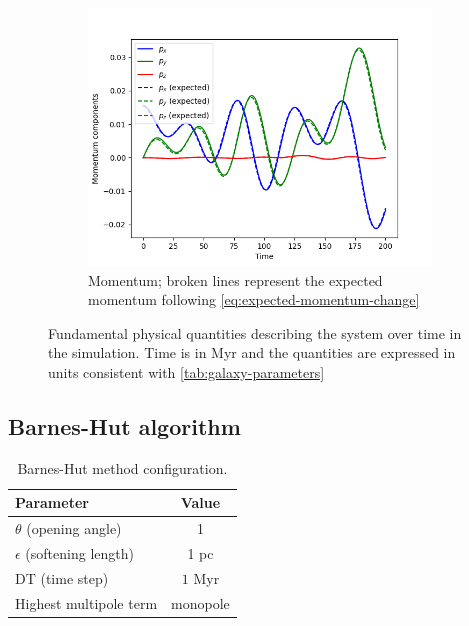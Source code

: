 \begin{figure}[H]
    \vspace{0.2cm}

    \begin{subfigure}[b]{0.5\textwidth}
        \centering
        \includegraphics[width=\textwidth]{chapters/results/img/p3m-galaxy/momentum.png}
        \caption{Momentum; broken lines represent the expected momentum following \autoref{eq:expected-momentum-change}}
        \label{fig:physical-quantities-p3m-sub3}
    \end{subfigure}

    \caption{Fundamental physical quantities describing the system over time in the \PThreeM{} simulation.
        Time is in Myr and the quantities are expressed in units consistent with \autoref{tab:galaxy-parameters}}
    \label{fig:physical-quantities-p3m}
\end{figure}

\subsection{Barnes-Hut algorithm}
\begin{table}[H]
    \centering
    \caption{Barnes-Hut method configuration.}
    \label{tab:bh-method-parameters}
    \begin{tabular}{lc}
        \toprule
        \textbf{Parameter}            & \textbf{Value} \\
        \midrule
        $\theta$ (opening angle)      & 1              \\
        $\epsilon$ (softening length) & 1 pc           \\
        DT (time step)                & $1$ Myr        \\
        Highest multipole term        & monopole       \\
        \bottomrule
    \end{tabular}
\end{table}

